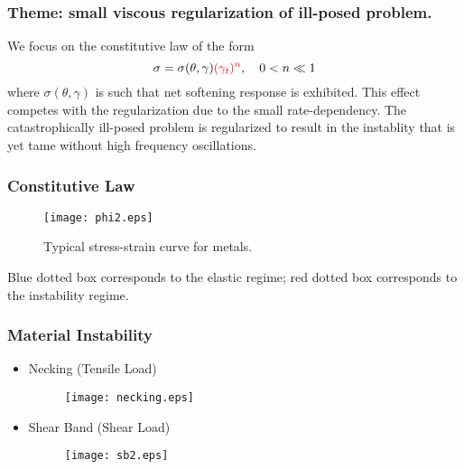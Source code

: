 \documentclass{beamer}
\def\red{\color{red}}
\def\blue{\color{blue}}
\begin{document}
\begin{frame}
 \frametitle{Theme: small viscous regularization of ill-posed problem.}
 We focus on the constitutive law of the form
$$\sigma=\sigma(\theta,\gamma){\red (\gamma_t)^n}, \quad 0<n\ll1$$
where $\sigma(\theta,\gamma)$ is such that {\blue net softening response} is exhibited. This effect competes with the regularization due to the {\blue small rate-dependency}.
 \vfill
The catastrophically ill-posed problem is regularized to result in the instablity that is yet tame without high frequency oscillations.
 \vfill
\end{frame}

\begin{frame}
 \frametitle{Constitutive Law}
 \begin{figure}
    \centering
    \center
    \texttt{[image: phi2.eps]} 
    \caption{Typical stress-strain curve for metals.}
 \end{figure} 
 Blue dotted box corresponds to the elastic regime; red dotted box corresponds to the instability regime.
 \vfill
\end{frame}

\begin{frame}
 \frametitle{Material Instability}
 \begin{itemize}
  \item Necking (Tensile Load)
   \begin{figure}
    \centering
      \texttt{[image: necking.eps]} 
    \end{figure} 
  \item Shear Band (Shear Load)
     \begin{figure}
    \centering
      \texttt{[image: sb2.eps]} 
    \end{figure} 
 \end{itemize}
 \vfill
\end{frame}
\end{document}
